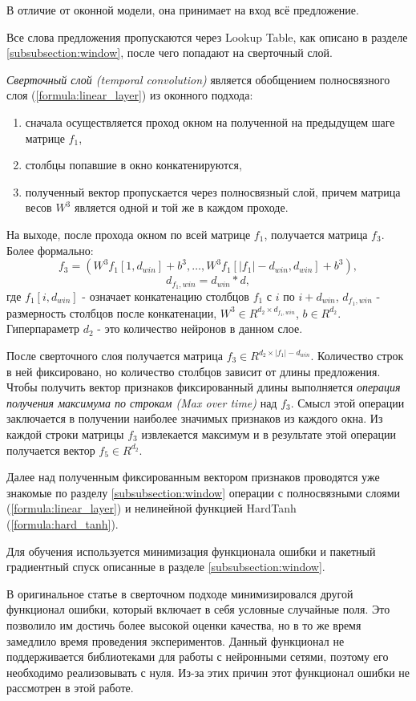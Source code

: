   В отличие от оконной модели, она принимает на вход всё предложение.

  Все слова предложения пропускаются через Lookup Table, как описано в разделе
  \ref{subsubsection:window}, после чего попадают на сверточный слой.

  \textit{Сверточный слой (temporal convolution)} является обобщением
  полносвязного слоя (\ref{formula:linear_layer}) из оконного подхода:
  \begin{enumerate}
    \item сначала осуществляется проход окном на полученной на предыдущем шаге матрице $f_1$,
    \item столбцы попавшие в окно конкатенируются,
    \item полученный вектор пропускается через полносвязный слой,
    причем матрица весов $W^3$ является одной и той же в каждом проходе.
  \end{enumerate}
  На выходе, после прохода окном по всей матрице $f_1$, получается матрица $f_3$.
  Более формально:
  \[
  f_3 =(W^3 f_1[1, d_{win}] + b^3,\ldots,W^3 f_1[|f_1| - d_{win}, d_{win}] + b^3),
  \]
  \[
  d_{f_1, win} = d_{win}*d,
  \]
  где $f_1[i, d_{win}]$ - означает конкатенацию столбцов $f_1$ с $i$ по $i + d_{win}$,
  $d_{f_1, win}$ - размерность столбцов после конкатенации,
  $W^3 \in R^{d_{2} \times d_{f_1, win}}$, $b \in R^{d_2}$. Гиперпараметр $d_{2}$ -
  это количество нейронов в данном слое.

  После сверточного слоя получается матрица $f_3 \in R^{d_2\times |f_1| - d_{win}}$.
  Количество строк в ней фиксировано, но количество столбцов зависит от длины предложения.
  Чтобы получить вектор признаков фиксированный длины выполняется \textit{операция
  получения максимума по строкам (Max over time)} над $f_3$.
  Смысл этой операции заключается в получении наиболее значимых признаков из каждого окна.
  Из каждой строки матрицы $f_3$ извлекается максимум и в результате этой
  операции получается вектор $f_5 \in R^{d_2}$.

  Далее над полученным фиксированным вектором признаков проводятся уже
  знакомые по разделу \ref{subsubsection:window}
  операции с полносвязными слоями (\ref{formula:linear_layer}) и
  нелинейной функцией HardTanh (\ref{formula:hard_tanh}).

  Для обучения используется минимизация функционала ошибки и пакетный градиентный
  спуск описанные в разделе \ref{subsubsection:window}.

  В оригинальное статье \citep{collobert2011natural} в сверточном подходе
  минимизировался другой функционал ошибки, который включает в себя условные случайные поля.
  Это позволило им достичь более высокой оценки качества, но в то же время замедлило
  время проведения экспериментов. Данный функционал не поддерживается библиотеками для
  работы с нейронными сетями, поэтому его необходимо реализовывать с нуля.
  Из-за этих причин этот функционал ошибки не рассмотрен в этой работе.

